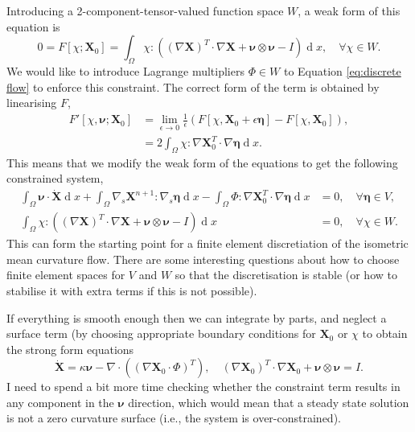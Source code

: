 \documentclass{article}
\def\MM#1{\boldsymbol{#1}}
\def\MM#1{\boldsymbol{#1}}
\DeclareMathOperator{\diff}{d}
\begin{document}
Introducing a 2-component-tensor-valued function space $W$, a weak
form of this equation is
\begin{equation} 
0 = F[\chi;\MM{X}_0] = \int_\Omega \chi : \left(
(\nabla\MM{X})^T\cdot\nabla\MM{X} + \MM{\nu}\otimes\MM{\nu} - I\right)\diff x,
\quad \forall \chi \in W.
\end{equation}
We would like to introduce Lagrange multipliers $\Phi\in W$ to
Equation \eqref{eq:discrete flow} to enforce this constraint. The correct
form of the term is obtained by linearising $F$,
\begin{align}
  F'[\chi,\MM{\nu};\MM{X}_0] & =
  \lim_{\epsilon\to 0}\frac{1}{\epsilon}
  \left(F[\chi,\MM{X}_0+\epsilon \MM{\eta}] - F[\chi,\MM{X}_0]\right), \\
  & = 2\int_\Omega \chi:\nabla\MM{X}^T_0\cdot \nabla\MM{\eta}\diff x.
\end{align}
This means that we modify the weak form of the equations to get the
following constrained system,
\begin{align}
\int_\Omega \MM{\nu} \cdot \dot{\MM{X}} \diff x
+\int_\Omega \nabla_s \MM{X}^{n+1} : \nabla_s \MM{\MM{\eta}}\diff x 
- \int_\Omega \Phi : \nabla\MM{X}^T_0\cdot \nabla\MM{\eta}\diff x &= 0,
\quad \forall \MM{\MM{\eta}}\in V, \\
\int_\Omega \chi : \left(
(\nabla\MM{X})^T\cdot\nabla\MM{X} + \MM{\nu}\otimes\MM{\nu} - I\right)\diff x & =
0, 
\quad \forall \chi \in W.
\end{align}
This can form the starting point for a finite element discretiation of
the isometric mean curvature flow. There are some interesting
questions about how to choose finite element spaces for $V$ and $W$ so
that the discretisation is stable (or how to stabilise it with extra
terms if this is not possible).

If everything is smooth enough then we can integrate by parts, and neglect
a surface term (by choosing appropriate boundary conditions for $\MM{X}_0$ or
$\chi$ to obtain the strong form equations
\begin{equation}
  \dot{\MM{X}} = \kappa\MM{\nu} - \nabla\cdot\left(\left(\nabla\MM{X}_0\cdot\Phi\right)^T\right),
  \quad (\nabla \MM{X}_0)^T\cdot \nabla \MM{X}_0 + \MM{\nu}\otimes\MM{\nu} = I.
\end{equation}
I need to spend a bit more time checking whether the constraint term
results in any component in the $\MM{\nu}$ direction, which would mean that
a steady state solution is not a zero curvature surface (i.e., the system
is over-constrained).
\end{document}
